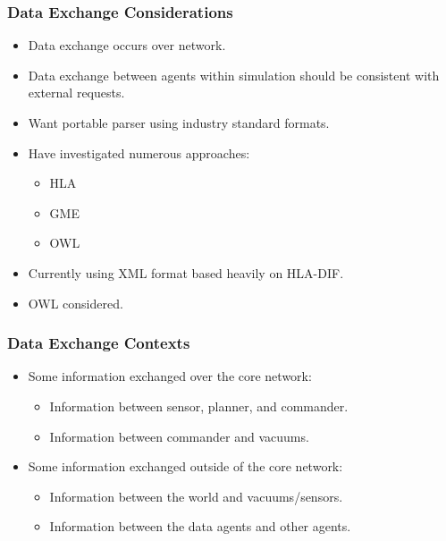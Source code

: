 \documentclass{beamer}
\begin{document}
\begin{frame}
  \frametitle{Data Exchange Considerations}

  \begin{itemize}
  \item Data exchange occurs over network.
  \item Data exchange between agents within simulation should be
    consistent with external requests.
  \item Want portable parser using industry standard formats.
  \item Have investigated numerous approaches:
    \begin{itemize}
    \item HLA
    \item GME
    \item OWL
    \end{itemize}
  \item Currently using XML format based heavily on HLA-DIF.
  \item OWL considered.
  \end{itemize}
  

\end{frame}


\begin{frame}
  \frametitle{Data Exchange Contexts}
  
  \begin{itemize}
  \item Some information exchanged over the core network:
    \begin{itemize}
    \item Information between sensor, planner, and commander.
    \item Information between commander and vacuums.
    \end{itemize}

  \item Some information exchanged outside of the core network:
    \begin{itemize}
    \item Information between the world and vacuums/sensors.
    \item Information between the data agents and other agents.
    \end{itemize}

  \end{itemize}

\end{frame}


%
%
%
%
\end{document}
